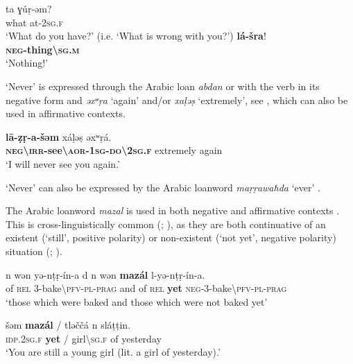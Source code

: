 \documentclass[output=paper,colorlinks,citecolor=brown]{langscibook}
\begin{document}
\ea\label{ex:siw:56}
\begin{xlist}[A: ]
        \gll ta ɣúṛ-əm? \\
             what at-\textsc{2sg.f} \\
        \glt ‘What do you have?’ (i.e. ‘What is wrong with you?’)
        \gll \textbf{lá-šra}! \\
             \textbf{\textsc{neg}-thing{\textbackslash}\textsc{sg.m}} \\
        \glt ‘Nothing!’
\end{xlist}
\z

‘Never’ is expressed through the Arabic loan \textit{abdan} or with the verb in its negative form and \textit{əxʷ}\textit{ṛa} ‘again’ and/or \textit{xaḷəṣ} ‘extremely’, see , which can also be used in affirmative contexts.

\ea\label{ex:siw:57}
    \gll \textbf{l\={a}-ẓṛ{}-a-šəm} xáḷəṣ əxʷṛá. \\
         \textbf{\textsc{neg}{\textbackslash}\textsc{irr}-see{\textbackslash}\textsc{aor-1sg-do\textbackslash2sg.f}} extremely again\\
    \glt ‘I will never see you again.’
\z

‘Never’ can also be expressed by the Arabic loanword \textit{maṛṛawaħda} ‘ever’ \citep[127]{Souag2013}. 

The Arabic loanword \textit{mazal} is used in both negative  and affirmative contexts . This is cross-linguistically common (\citealt{VeselinovaDevos2021}; \citealt{VeselinovaAsplund2020}), as they are both continuative of an existent (‘still’, positive polarity) or non-existent (‘not yet’, negative polarity) situation (\citealt{vanBaar1997}; \citealt{Auwera1998}).

\ea\label{ex:siw:58}
    \gll n wən yə-nṭṛ-\'{i}n-a d n wən \textbf{maz\'{a}l} l-yə-nṭṛ{}-\'{i}n-a. \\
         of \textsc{rel} 3-bake{\textbackslash}\textsc{pfv-pl-prag} and of \textsc{rel}  \textbf{yet} \textsc{neg}-3-bake{\textbackslash}\textsc{pfv-pl-prag} \\
    \glt ‘those which were baked and those which were not baked yet’
\z 

\ea\label{ex:siw:59}
    \gll šəm \textbf{mazál} / tləččá n sláṭṭin. \\
         \textsc{idp.2sg.f} \textbf{yet} / girl{\textbackslash}\textsc{sg.f} of yesterday \\
    \glt ‘You are still a young girl (lit. a girl of yesterday).’
\z
\end{document}
